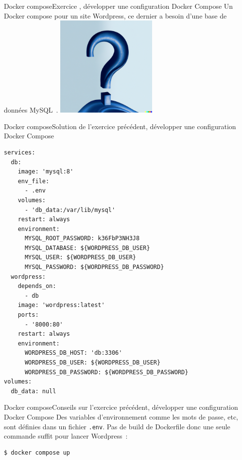 \documentclass{beamer}
\begin{document}
    \begin{frame}{Docker compose}{Exercice \execcounterdispinc{}, développer une configuration Docker Compose}
        Un Docker compose pour un site Wordpress, ce dernier a besoin d'une base de données MySQL~.
        \bigbreak
        \centering
        \includegraphics[width=5cm]{image/question-mark-on-a-blank-background}
    \end{frame}

    \begin{frame}[fragile]{Docker compose}{Solution de l'exercice précédent, développer une configuration Docker Compose}
        \begin{lstlisting}[basicstyle=\ttfamily\tiny]
services:
  db:
    image: 'mysql:8'
    env_file:
      - .env
    volumes:
      - 'db_data:/var/lib/mysql'
    restart: always
    environment:
      MYSQL_ROOT_PASSWORD: k36FbP3NH3J8
      MYSQL_DATABASE: ${WORDPRESS_DB_USER}
      MYSQL_USER: ${WORDPRESS_DB_USER}
      MYSQL_PASSWORD: ${WORDPRESS_DB_PASSWORD}
  wordpress:
    depends_on:
      - db
    image: 'wordpress:latest'
    ports:
      - '8000:80'
    restart: always
    environment:
      WORDPRESS_DB_HOST: 'db:3306'
      WORDPRESS_DB_USER: ${WORDPRESS_DB_USER}
      WORDPRESS_DB_PASSWORD: ${WORDPRESS_DB_PASSWORD}
volumes:
  db_data: null
        \end{lstlisting}
    \end{frame}

    \begin{frame}[fragile]{Docker compose}{Conseils sur l'exercice précédent, développer une configuration Docker Compose}
        Des variables d'environnement comme les mots de passe, etc, sont définies dans un fichier \lstinline{.env}.
        \bigbreak
        Pas de build de Dockerfile donc une seule commande suffit pour lancer Wordpress~:
        \begin{lstlisting}[language=bash]
$ docker compose up
        \end{lstlisting}
    \end{frame}
\end{document}
